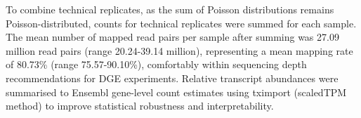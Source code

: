To combine technical replicates, as the sum of Poisson distributions remains Poisson-distributed, counts for technical replicates were summed for each sample.
%
%
The mean number of mapped read pairs per sample after summing was 27.09 million read pairs (range 20.24-39.14 million), representing a mean mapping rate of 80.73\% (range 75.57-90.10\%), comfortably within sequencing depth recommendations for \gls{DGE} experiments\autocite{liu2014RNAseqDifferentialExpression}.
Relative transcript abundances were summarised to Ensembl gene-level count estimates using tximport (scaledTPM method) to improve statistical robustness and interpretability\autocite{soneson2016DifferentialAnalysesRNAseq}.

